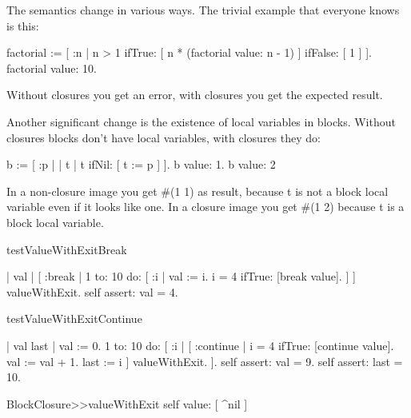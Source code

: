 \documentclass[a4paper,10pt,twoside]{book}
\begin{document}
The semantics change in various ways. The trivial example that everyone 
knows is this:
\begin{code}{}
factorial := [ :n |
	n > 1
		ifTrue: [ n * (factorial value: n - 1) ]
		ifFalse: [ 1 ] ].
factorial value: 10.
\end{code}
Without closures you get an error, with closures you get the expected 
result.

Another significant change is the existence of local variables in blocks. 
Without closures blocks don't have local variables, with closures they do:

\begin{code}{}
b := [ :p |
	| t |
	t ifNil: [ t := p ] ].
{ b value: 1. b value: 2 }
\end{code}

In a non-closure image you get \#(1 1) as result, because t is not a block 
local variable even if it looks like one. In a closure image you get \#(1 2)
because t is a block local variable.


\begin{code}{}
testValueWithExitBreak

	| val |	
	[ :break |
	    1 to: 10 do: [ :i |
			val := i.
			i = 4 ifTrue: [break value].
		] 
	] valueWithExit.
	self assert: val = 4.



testValueWithExitContinue

	| val last |	
	val := 0. 
	1 to: 10 do: [ :i |
		[ :continue |
			i = 4 ifTrue: [continue value].
			val := val + 1.
			last := i
		] valueWithExit.
	].
	self assert: val = 9.
	self assert: last = 10.	

BlockClosure>>valueWithExit 
	  self value: [ ^nil ]
\end{code}

\ifx\wholebook\relax\else
   
   
\end{document}
